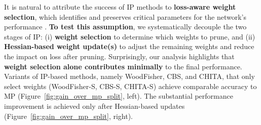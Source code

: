 It is natural to attribute the success of IP methods to \textbf{loss-aware weight selection}, which identifies and preserves critical parameters for the network's performance \cite{brain_damage}. 
\textbf{To test this assumption}, we systematically decouple the two stages of IP: (i) \textbf{weight selection} to determine which weights to prune, and (ii) \textbf{Hessian-based weight update(s)} to adjust the remaining weights and reduce the impact on loss after pruning. Surprisingly, our analysis highlights that \textbf{weight selection alone contributes minimally} to the final performance. Variants of IP-based methods, namely WoodFisher, CBS, and CHITA, that only select weights (WoodFisher-S, CBS-S, CHITA-S) achieve comparable accuracy to MP (Figure~\ref{fig:gain_over_mp_split}, left). The substantial performance improvement is achieved only after Hessian-based updates (Figure~\ref{fig:gain_over_mp_split}, right).


